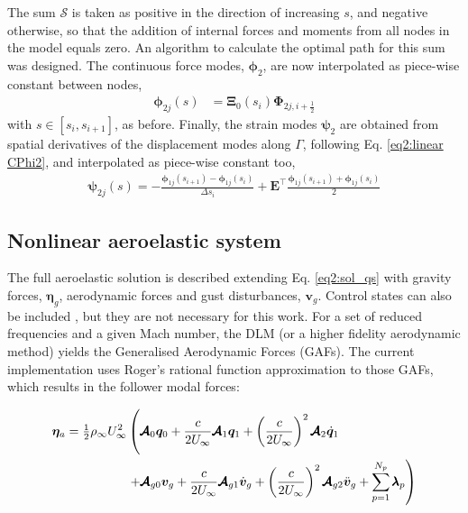 \documentclass[11pt]{article}
\begin{document}
The sum \(\mathcal{S}\) is taken as positive in the direction of increasing \(s\), and negative otherwise, so that the addition of internal forces and moments from all nodes in the model equals zero. An algorithm to calculate the optimal path for this sum was designed. The continuous force modes, \(\pmb{\phi}_{2}\), are now interpolated as piece-wise constant between nodes,
\begin{align}
\pmb{\phi}_{2j}(s) &= \pmb{\Xi}_{0}(s_i) \pmb{\Phi}_{2j,i+\frac{1}{2}} 
\end{align}
with \(s \in [s_i,s_{i+1}]\), as before. Finally, the strain modes \(\pmb{\psi}_{2}\) are obtained from spatial derivatives of the displacement modes along \(\Gamma\), following Eq. \eqref{eq2:linear CPhi2}, and interpolated as piece-wise constant too,
\begin{align}\label{eq2:psi2}
\pmb{\psi}_{2j}(s) = -\frac{\pmb{\phi}_{1j}(s_{i+1})-\pmb{\phi}_{1j}(s_{i})}{\Delta s_{i}}+ \pmb{E}^\top\frac{\pmb{\phi}_{1j}(s_{i+1})+\pmb{\phi}_{1j}(s_{i})}{2} 
\end{align}

\subsection{Nonlinear aeroelastic system}
\label{sec:org7092880}
The full aeroelastic solution is described extending Eq.  \eqref{eq2:sol_qs} with gravity forces, \(\bm{\eta}_g\), aerodynamic forces and gust disturbances, \(\bm{v}_g\). Control states can also be included \cite{CEA2021a}, but they are not necessary for this work. For a set of reduced frequencies and a given Mach number, the DLM (or a higher fidelity aerodynamic method) yields the Generalised Aerodynamic Forces (GAFs). The current implementation uses Roger's rational function approximation to those GAFs, which results in the follower modal forces:

\begin{equation}\label{eq3:eta_full}
\begin{split}
\bm{\eta}_a = \tfrac12\rho_\infty U_\infty^2 & \left(\vphantom{\sum_{p=1}^{N_p}} \pmb{\mathcal{A}}_0\bm{q}_0 +\frac{c}{2U_\infty}\pmb{\mathcal{A}}_1 \bm{q}_1 +\left(\frac{c}{2U_\infty}\right)^2 \pmb{\mathcal{A}}_2\dot{\bm{q}}_1   \right.  \\
& \left. + \pmb{\mathcal{A}}_{g0}\bm{v}_g +\frac{c}{2U_\infty}\pmb{\mathcal{A}}_{g1} \dot{\bm{v}}_g +\left(\frac{c}{2U_\infty}\right)^2 \pmb{\mathcal{A}}_{g2}\ddot{\bm{v}}_g +  \sum_{p=1}^{N_p} \pmb{\lambda}_p  \right) 
\end{split}
\end{equation}
\end{document}
